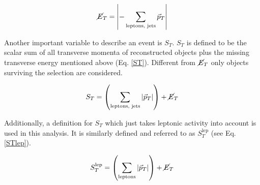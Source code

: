 	\begin{equation}
		\cancel{E}_T = \left| - \sum_{\textrm{leptons, jets}}^{} \vec{p}_T \right|
		\label{MET}
	\end{equation}
	
	\noindent Another important variable to describe an event is $S_T$. $S_T$ is defined to be the scalar sum of all transverse momenta of reconstructed objects plus the missing transverse energy mentioned above (Eq. \ref{ST}). Different from $\cancel{E}_T$ only objects surviving the selection are considered.
	
	\begin{equation}
		S_T = \left( \sum_{\textrm{leptons, jets}}^{} \vert \vec{p}_T \vert \right) + \cancel{E}_T
		\label{ST}
	\end{equation}
	
	\noindent Additionally, a definition for $S_T$ which just takes leptonic activity into account is used in this analysis. It is similarly defined and referred to as $S_T^{\text{lep}}$ (see Eq. \ref{STlep}).
	
	\begin{equation}
		S_T^\text{lep} = \left( \sum_{\textrm{leptons}}^{} \vert \vec{p}_T \vert \right) + \cancel{E}_T
		\label{STlep}
	\end{equation}	
